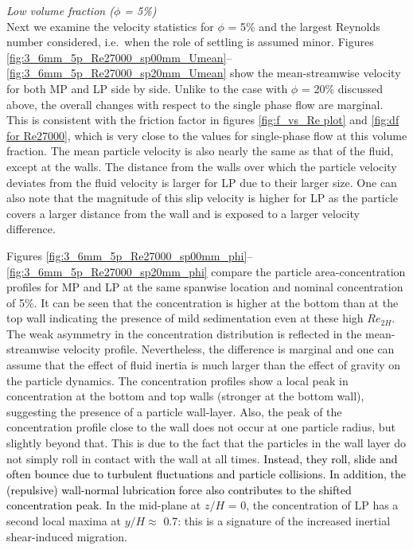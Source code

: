 \documentclass{jfm}
\def\sz#1{{\textcolor{black}{#1}}}
\begin{document}
{\it Low volume fraction ($\phi$ = 5\%)}\\

Next we examine the velocity statistics for $\phi$ = 5\% and the largest Reynolds number considered, i.e.\ when the role of settling is assumed minor. Figures \ref{fig:3_6mm_5p_Re27000_sp00mm_Umean}--\ref{fig:3_6mm_5p_Re27000_sp20mm_Umean} show the mean-streamwise velocity for both MP and LP side by side. Unlike to the case with $\phi$ = 20\% discussed above, the overall changes with respect to the single phase flow are marginal. 
This is consistent with the friction factor in figures \ref{fig:f_vs_Re plot} and \ref{fig:df for Re27000}, which is very close to the values for single-phase flow at this volume fraction. 
The mean particle velocity is also nearly the same as that of the fluid, except at the walls. The distance from the walls over which the particle velocity deviates from the fluid velocity is larger for LP due to their larger size. One can also note that the magnitude of this slip velocity is higher for LP as the particle covers a larger distance from the wall and is exposed to a larger velocity difference. 




Figures \ref{fig:3_6mm_5p_Re27000_sp00mm_phi}--\ref{fig:3_6mm_5p_Re27000_sp20mm_phi} compare the particle area-concentration profiles for MP and LP at the same spanwise location and nominal concentration of 5\%. It can be seen that the concentration is higher at the bottom than at the top wall indicating the presence of mild sedimentation even at these high $Re_{2H}$. The weak asymmetry in the concentration distribution is reflected in the mean-streamwise velocity profile. Nevertheless, the difference is marginal and one can assume that the effect of fluid inertia is much larger than the effect of gravity on the particle dynamics. 
The concentration profiles show a local peak in concentration at the bottom and top walls (stronger at the bottom wall), suggesting the presence of a particle wall-layer. Also, the peak of the concentration profile close to the wall does not occur at one particle radius, but slightly beyond that. This is due to the fact that the particles in the wall layer do not simply roll in contact with the wall at all times. \sz{Instead, they roll, slide and often bounce due to turbulent fluctuations and particle collisions. In addition, the (repulsive) wall-normal lubrication force also contributes to the shifted concentration peak.} 
In the mid-plane at $z/H$ = 0, the concentration of LP has a second local maxima at $y/H\approx$ 0.7: this is a signature of the increased inertial shear-induced migration.
\end{document}
